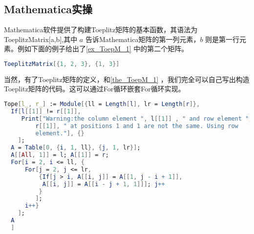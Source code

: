 \subsection{Mathematica实操}
Mathematica软件提供了构建Toeplitz矩阵的基本函数，其语法为 ToeplitzMatrix[a,b],其中 $a$ 告诉Mathematica矩阵的第一列元素，$b$ 则是第一行元素。例如下面的例子给出了\autoref{ex_ToepM_1} 中的第二个矩阵。
\begin{lstlisting}[language=mathematica, caption=Mathematica构造Toeplitz矩阵]
ToeplitzMatrix[{1, 2, 3}, {1, 3}]
\end{lstlisting}
当然，有了Toeplitz矩阵的定义，和\autoref{the_ToepM_1} ，我们完全可以自己写出构造Toeplitz矩阵的代码。这可以通过For循环嵌套For循环实现。
\begin{lstlisting}[language=mathematica, caption=Mathematica自写Toeplitz矩阵代码]
Tope[l_, r_] := Module[{ll = Length[l], lr = Length[r]},
  If[l[[1]] != r[[1]], 
     Print["Warning:the column element ", l[[1]] , " and row element ", 
         r[[1]], " at positions 1 and 1 are not the same. Using row 
         element."], {}
    ];
  A = Table[0, {i, 1, ll}, {j, 1, lr}];
  A[[All, 1]] = l; A[[1]] = r;
  For[i = 2, i <= ll, {
      For[j = 2, j <= lr,
          {If[j > i, A[[i, j]] = A[[1, j - i + 1]], 
           A[[i, j]] = A[[i - j + 1, 1]]]; j++
          }
         ];
      i++}
    ];
  A
  ]
\end{lstlisting}


